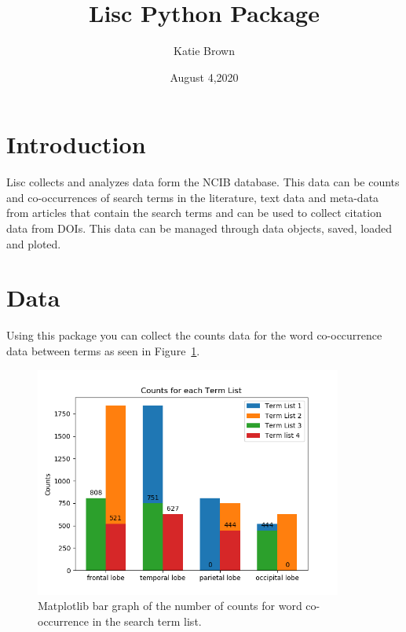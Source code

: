\documentclass[12pt, letterpaper]{article}
\title{Lisc Python Package}
\author{Katie Brown}
\date{August 4,2020}
\begin{document}
\maketitle

\section{Introduction}

Lisc collects and analyzes data form the NCIB database. This data can be counts and co-occurrences of search terms in the literature, text data and meta-data from articles that contain the search terms and can be used to collect citation data from DOIs. This data can be managed through data objects, saved, loaded and ploted.

\section{Data}
Using this package you can collect the counts data for the word co-occurrence data between terms as seen in Figure~\ref{fig:counts}.

% 
\begin{figure} 
  \centering 
  \includegraphics[width=0.9\textwidth]{counts}
  \caption{Matplotlib bar graph of the number of counts for word co-occurrence in the search term list.} 
  \label{fig:counts}
\end{figure}
%
\end{document}
